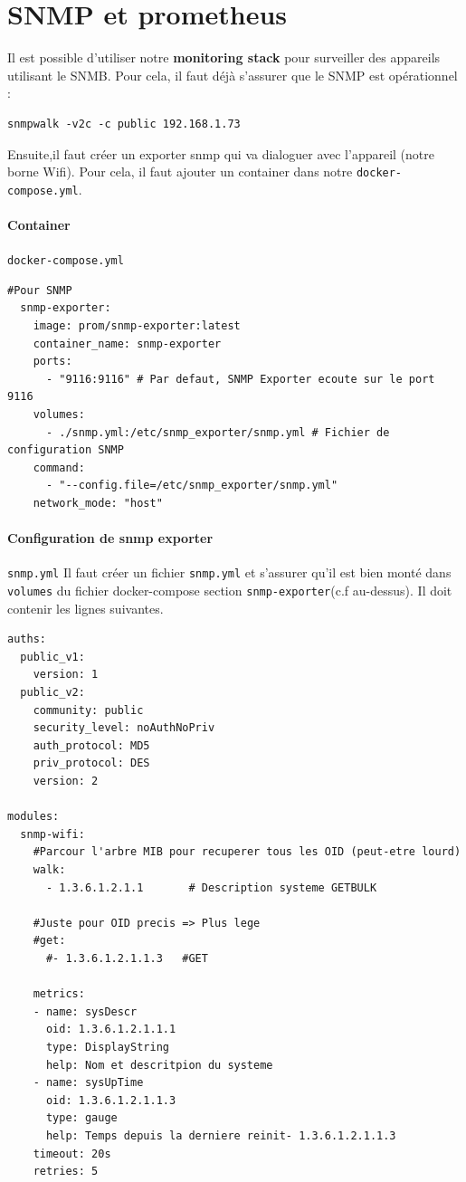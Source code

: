 \documentclass[french, 12pt]{article}%
\begin{document}
\normalcolor
\fi

\section{SNMP et prometheus}

Il est possible d'utiliser notre \textbf{monitoring stack} pour surveiller des appareils utilisant le SNMB. Pour cela, il faut déjà s'assurer que le SNMP est opérationnel : 

\begin{lstlisting}[style=commande] 
snmpwalk -v2c -c public 192.168.1.73
\end{lstlisting} 

Ensuite,il faut créer un exporter snmp qui va dialoguer avec l'appareil (notre borne Wifi). Pour cela, il faut ajouter un container dans notre \verb?docker-compose.yml?.

\paragraph{Container } \verb?docker-compose.yml?

\begin{lstlisting}[style=commande] 
#Pour SNMP	
  snmp-exporter:
    image: prom/snmp-exporter:latest
    container_name: snmp-exporter
    ports:
      - "9116:9116" # Par defaut, SNMP Exporter ecoute sur le port 9116
    volumes:
      - ./snmp.yml:/etc/snmp_exporter/snmp.yml # Fichier de configuration SNMP
    command:
      - "--config.file=/etc/snmp_exporter/snmp.yml"
    network_mode: "host"
\end{lstlisting} 


\paragraph{Configuration de snmp exporter } \verb?snmp.yml?
Il faut créer un fichier \verb?snmp.yml? et s'assurer qu'il est bien monté dans \verb?volumes? du fichier docker-compose section \verb?snmp-exporter?(c.f au-dessus).  Il doit contenir les lignes suivantes.

\begin{lstlisting}[style=commande] 
auths:
  public_v1:
    version: 1
  public_v2:
    community: public
    security_level: noAuthNoPriv
    auth_protocol: MD5
    priv_protocol: DES
    version: 2

modules:
  snmp-wifi:
    #Parcour l'arbre MIB pour recuperer tous les OID (peut-etre lourd)
    walk:
      - 1.3.6.1.2.1.1       # Description systeme GETBULK
      
    #Juste pour OID precis => Plus lege
    #get:
      #- 1.3.6.1.2.1.1.3   #GET
    
    metrics:
    - name: sysDescr
      oid: 1.3.6.1.2.1.1.1
      type: DisplayString
      help: Nom et descritpion du systeme
    - name: sysUpTime
      oid: 1.3.6.1.2.1.1.3
      type: gauge
      help: Temps depuis la derniere reinit- 1.3.6.1.2.1.1.3  
    timeout: 20s
    retries: 5
\end{lstlisting} 
 
\end{document}
